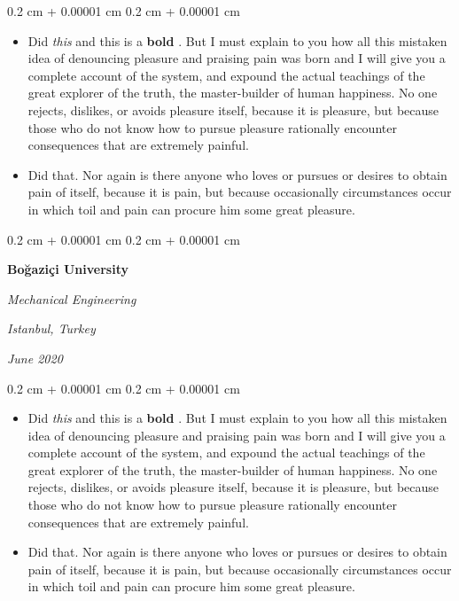 \documentclass[10pt, letterpaper]{article}
\newenvironment{highlights}{
    \begin{itemize}[
        topsep=0.10 cm,
        parsep=0.10 cm,
        partopsep=0pt,
        itemsep=0pt,
        leftmargin=0.4 cm + 10pt
    ]
}{
    \end{itemize}
} %
\newenvironment{onecolentry}{
    \begin{adjustwidth}{
        0.2 cm + 0.00001 cm
    }{
        0.2 cm + 0.00001 cm
    }
}{
    \end{adjustwidth}
} %
\newenvironment{twocolentry}[2][]{
    \onecolentry
    \def\secondColumn{#2}
    \setcolumnwidth{\fill, 4.5 cm}
    \begin{paracol}{2}
}{
    \switchcolumn \raggedleft \secondColumn
    \end{paracol}
    \endonecolentry
} %
\let\hrefWithoutArrow\href
\renewcommand{\href}[2]{\hrefWithoutArrow{#1}{\ifthenelse{\equal{#2}{}}{ }{#2 }\raisebox{.15ex}{\footnotesize \faExternalLink*}}}
\begin{document}
        \vspace{0.10 cm}
        \begin{onecolentry}
            \begin{highlights}
                \item Did \textit{this} and this is a \textbf{bold} \href{https://example.com}{link}. But I must explain to you how all this mistaken idea of denouncing pleasure and praising pain was born and I will give you a complete account of the system, and expound the actual teachings of the great explorer of the truth, the master-builder of human happiness. No one rejects, dislikes, or avoids pleasure itself, because it is pleasure, but because those who do not know how to pursue pleasure rationally encounter consequences that are extremely painful.
                \item Did that. Nor again is there anyone who loves or pursues or desires to obtain pain of itself, because it is pain, but because occasionally circumstances occur in which toil and pain can procure him some great pleasure.
            \end{highlights}
        \end{onecolentry}


        \vspace{0.2 cm}

        \begin{twocolentry}{
        \textit{Istanbul, Turkey}    
            
        \textit{June 2020}}
            \textbf{Boğaziçi University}

            \textit{Mechanical Engineering}
        \end{twocolentry}

        \vspace{0.10 cm}
        \begin{onecolentry}
            \begin{highlights}
                \item Did \textit{this} and this is a \textbf{bold} \href{https://example.com}{link}. But I must explain to you how all this mistaken idea of denouncing pleasure and praising pain was born and I will give you a complete account of the system, and expound the actual teachings of the great explorer of the truth, the master-builder of human happiness. No one rejects, dislikes, or avoids pleasure itself, because it is pleasure, but because those who do not know how to pursue pleasure rationally encounter consequences that are extremely painful.
                \item Did that. Nor again is there anyone who loves or pursues or desires to obtain pain of itself, because it is pain, but because occasionally circumstances occur in which toil and pain can procure him some great pleasure.
            \end{highlights}
        \end{onecolentry}
\end{document}
